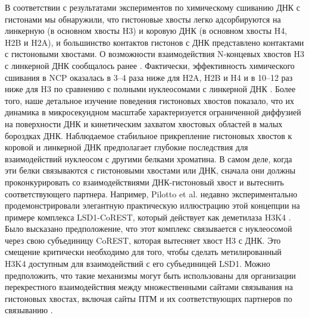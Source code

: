     В соответствии с результатами экспериментов по химическому сшиванию  ДНК с гистонами \cite{angelov_preferential_2001,stefanovsky_laser-induced_1989} мы обнаружили, что гистоновые хвосты легко адсорбируются на линкерную (в основном хвосты H3) и коровую ДНК (в основном хвосты H4, H2B и H2A), и большинство контактов гистонов с ДНК представлено контактами с гистоновыми хвостами. О возможности взаимодействия N-концевых хвостов H3 с линкерной ДНК сообщалось ранее \cite{rhee_subnucleosomal_2014,angelov_preferential_2001}. Фактически, эффективность химического сшивания в NCP оказалась в 3–4 раза ниже для H2A, H2B и H4 и в 10–12 раз ниже для H3 по сравнению с полными нуклеосомами с линкерной ДНК \cite{stefanovsky_laser-induced_1989}. Более того, наше детальное изучение поведения гистоновых хвостов показало, что их динамика в микросекундном масштабе характеризуется ограниченной диффузией на поверхности ДНК и кинетическим захватом хвостовых областей в малых бороздках ДНК. Наблюдаемое стабильное прикрепление гистоновых хвостов к коровой и линкерной ДНК предполагает глубокие последствия для взаимодействий нуклеосом с другими белками хроматина. В самом деле, когда эти белки связываются с гистоновыми хвостами или ДНК, сначала они должны проконкурировать со взаимодействиями ДНК-гистоновый хвост и вытеснить соответствующего партнера. Например, Pilotto et al. недавно экспериментально продемонстрировали элегантную практическую иллюстрацию этой концепции на примере комплекса LSD1-CoREST, который действует как деметилаза H3K4 \cite{pilotto_interplay_2015}. Было высказано предположение, что этот комплекс связывается с нуклеосомой через свою субъединицу CoREST, которая вытесняет хвост H3 с ДНК. Это смещение критически необходимо для того, чтобы сделать метилированный H3K4 доступным для взаимодействий с его субъединицей LSD1. Можно предположить, что такие механизмы могут быть использованы для организации перекрестного взаимодействия между множественными сайтами связывания на гистоновых хвостах, включая сайты ПТМ и их соответствующих партнеров по связыванию \cite{ruthenburg_multivalent_2007,nishi_crosstalk_2015}.
    
